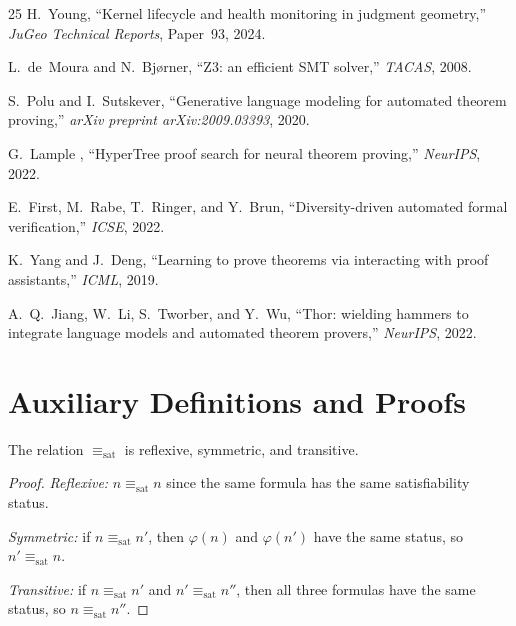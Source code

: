 \documentclass[11pt]{article}
\begin{document}
\begin{thebibliography}{25}
H.~Young,
``Kernel lifecycle and health monitoring in judgment geometry,''
\emph{JuGeo Technical Reports}, Paper~93, 2024.

L.~de~Moura and N.~Bj{\o}rner,
``Z3: an efficient SMT solver,''
\emph{TACAS}, 2008.

S.~Polu and I.~Sutskever,
``Generative language modeling for automated theorem proving,''
\emph{arXiv preprint arXiv:2009.03393}, 2020.

G.~Lample \etal{},
``HyperTree proof search for neural theorem proving,''
\emph{NeurIPS}, 2022.

E.~First, M.~Rabe, T.~Ringer, and Y.~Brun,
``Diversity-driven automated formal verification,''
\emph{ICSE}, 2022.

K.~Yang and J.~Deng,
``Learning to prove theorems via interacting with proof
assistants,''
\emph{ICML}, 2019.

A.~Q.~Jiang, W.~Li, S.~Tworber, and Y.~Wu,
``Thor: wielding hammers to integrate language models and
automated theorem provers,''
\emph{NeurIPS}, 2022.

\end{thebibliography}

\appendix

\section{Auxiliary Definitions and Proofs}\label{app:proofs}

\begin{lemma}%
\label{lem:equisatequiv}
The relation $\equiv_{\mathrm{sat}}$ is reflexive, symmetric,
and transitive.
\end{lemma}
\begin{proof}
\emph{Reflexive:} $n \equiv_{\mathrm{sat}} n$ since the
same formula has the same satisfiability status.

\emph{Symmetric:} if $n \equiv_{\mathrm{sat}} n'$, then
$\varphi(n)$ and $\varphi(n')$ have the same status, so
$n' \equiv_{\mathrm{sat}} n$.

\emph{Transitive:} if $n \equiv_{\mathrm{sat}} n'$ and
$n' \equiv_{\mathrm{sat}} n''$, then all three formulas
have the same status, so $n \equiv_{\mathrm{sat}} n''$.
\end{proof}
\end{document}
